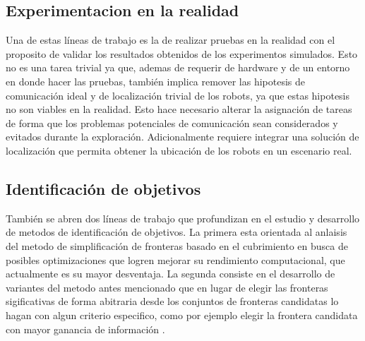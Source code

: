 \subsection{Experimentacion en la realidad}

Una de estas líneas de trabajo es la de realizar pruebas en la realidad con el
proposito de validar los resultados obtenidos de los experimentos simulados.
Esto no es una tarea trivial ya que, ademas de requerir de hardware y de un
entorno en donde hacer las pruebas, también implica remover las hipotesis de
comunicación ideal y de localización trivial de los robots, ya que estas
hipotesis no son viables en la realidad. Esto hace necesario alterar la
asignación de tareas de forma que los problemas potenciales de comunicación
sean considerados y evitados durante la exploración. Adicionalmente requiere
integrar una solución de localización que permita obtener la ubicación de los
robots en un escenario real.

\subsection{Identificación de objetivos}




También se abren dos líneas de trabajo que profundizan en el estudio y
desarrollo de metodos de identificación de objetivos. La primera esta orientada
al anlaisis del metodo de simplificación de fronteras basado en el cubrimiento
en busca de posibles optimizaciones que logren mejorar su rendimiento
computacional, que actualmente es su mayor desventaja. La segunda consiste en
el desarrollo de variantes del metodo antes mencionado que en lugar de elegir
las fronteras sigificativas de forma abitraria desde los conjuntos de fronteras
candidatas lo hagan con algun criterio especifico, como por ejemplo elegir la
frontera candidata con mayor ganancia de información \cite{amorin2019novel}.


